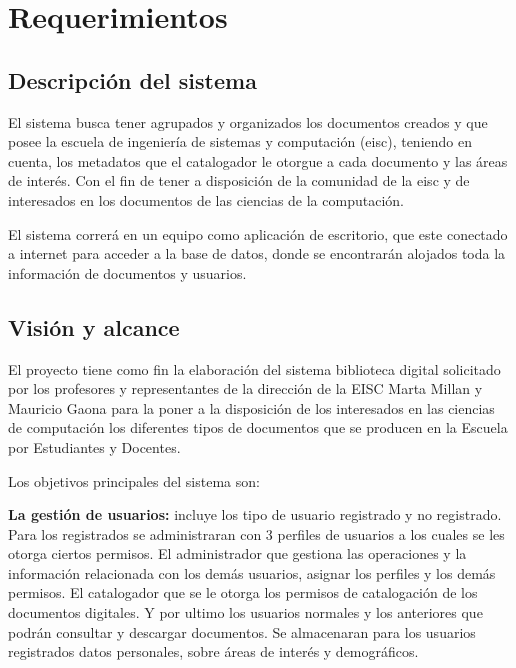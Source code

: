 \documentclass[]{article}
\begin{document}
\section{Requerimientos}
        \subsection{Descripción del sistema}
        El sistema busca tener agrupados y organizados los documentos creados y que posee la
        escuela de ingeniería de sistemas y computación (eisc), teniendo en cuenta, los metadatos
        que el catalogador le otorgue a cada documento y las áreas de interés. Con el fin de tener
        a disposición de la comunidad de la eisc y de interesados en los documentos de las ciencias
        de la computación.
        
        El sistema correrá en un equipo como aplicación de escritorio, que este conectado a 
        internet para acceder a la base de datos, donde se encontrarán alojados toda la información
        de documentos y usuarios.
        
        \subsection{Visión y alcance}
        El proyecto tiene como fin la elaboración del sistema biblioteca digital solicitado por los
        profesores y representantes de la dirección de la EISC Marta Millan y Mauricio Gaona para
        la poner a la disposición de los interesados en las ciencias de computación los diferentes
        tipos de documentos que se producen en la Escuela por Estudiantes y Docentes.
        
        Los objetivos principales del sistema son:
        
        \textbf{La gestión de usuarios:} incluye los tipo de usuario registrado y no registrado.
        Para los registrados se administraran con 3 perfiles de usuarios a los cuales se les otorga
        ciertos permisos. El administrador que gestiona las operaciones y la información 
        relacionada con los demás usuarios, asignar los perfiles y los demás permisos. El 
        catalogador que se le otorga los permisos de catalogación de los documentos digitales. Y
        por ultimo los usuarios normales y los anteriores que podrán consultar y descargar
        documentos. Se almacenaran para los usuarios registrados datos personales, sobre áreas de 
        interés y demográficos.
        
\end{document}
